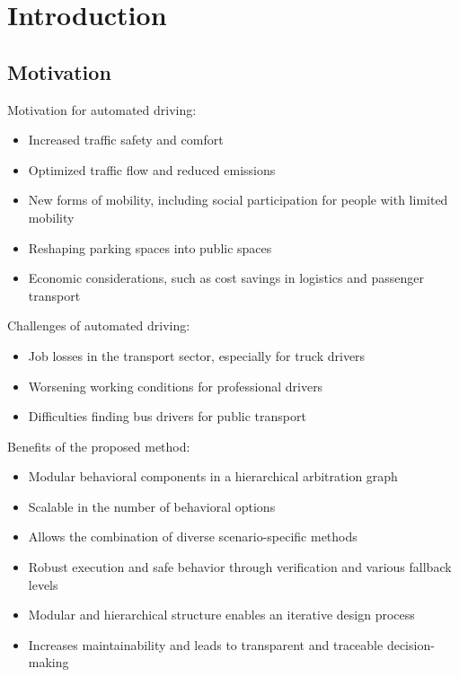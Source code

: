 \section{Introduction}

\subsection{Motivation}

Motivation for automated driving:
\begin{itemize}
    \item Increased traffic safety and comfort
    \item Optimized traffic flow and reduced emissions
    \item New forms of mobility, including social participation for people with limited mobility
    \item Reshaping parking spaces into public spaces
    \item Economic considerations, such as cost savings in logistics and passenger transport
\end{itemize}

Challenges of automated driving:
\begin{itemize}
    \item Job losses in the transport sector, especially for truck drivers
    \item Worsening working conditions for professional drivers
    \item Difficulties finding bus drivers for public transport
\end{itemize}

Benefits of the proposed method:
\begin{itemize}
    \item Modular behavioral components in a hierarchical arbitration graph
    \item Scalable in the number of behavioral options
    \item Allows the combination of diverse scenario-specific methods
    \item Robust execution and safe behavior through verification and various fallback levels
    \item Modular and hierarchical structure enables an iterative design process
    \item Increases maintainability and leads to transparent and traceable decision-making
\end{itemize}

